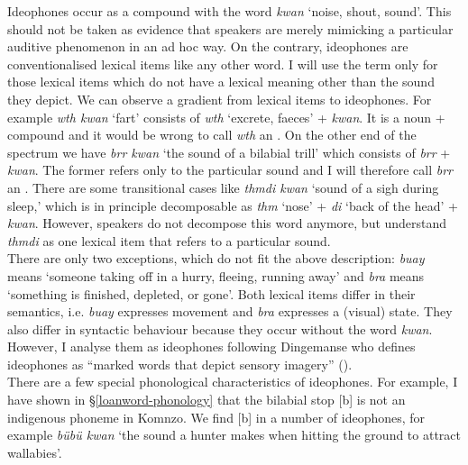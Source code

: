 Ideophones occur as a compound with the word \emph{kwan} `noise, shout, sound'. This should not be taken as evidence that speakers are merely mimicking a particular auditive phenomenon in an ad hoc way. On the contrary, ideophones are conventionalised lexical items like any other word. I will use the term  only for those lexical items which do not have a lexical meaning other than the sound they depict. We can observe a gradient from lexical items to ideophones. For example \emph{wth kwan} `fart' consists of \emph{wth} `excrete, faeces' + \emph{kwan}. It is a noun +  compound and it would be wrong to call \emph{wth} an . On the other end of the spectrum we have \emph{brr kwan} `the sound of a bilabial trill' which consists of \emph{brr} + \emph{kwan}. The former refers only to the particular sound and I will therefore call \emph{brr} an . There are some transitional cases like \emph{thmdi kwan} `sound of a sigh during sleep,' which is in principle decomposable as \emph{thm} `nose' + \emph{di} `back of the head' + \emph{kwan}. However, speakers do not decompose this word anymore, but understand \emph{thmdi} as one lexical item that refers to a particular sound.\\

There are only two exceptions, which do not fit the above description: \emph{buay} means `someone taking off in a hurry, fleeing, running away' and \emph{bra} means `something is finished, depleted, or gone'. Both lexical items differ in their semantics, i.e. \emph{buay} expresses movement and \emph{bra} expresses a (visual) state. They also differ in syntactic behaviour because they occur without the word \emph{kwan}. However, I analyse them as ideophones following Dingemanse who defines ideophones as ``marked words that depict sensory imagery'' (\citeyear[655]{Dingemanse:2012fc}).\\

There are a few special phonological characteristics of ideophones. For example, I have shown in \S{}\ref{loanword-phonology} that the bilabial stop [b] is not an indigenous phoneme in Komnzo. We find [b] in a number of ideophones, for example \emph{bübü kwan} `the sound a hunter makes when hitting the ground to attract wallabies'.

